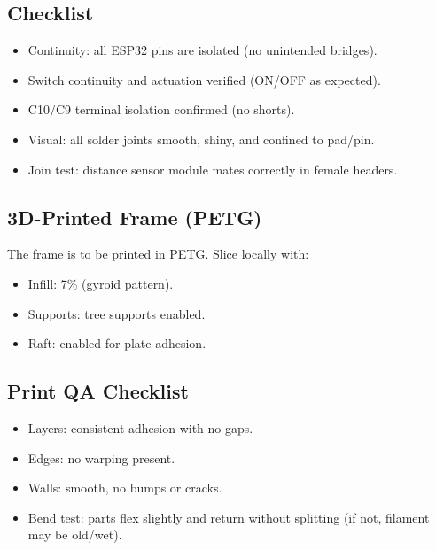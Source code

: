 \subsection*{Checklist}
\begin{itemize}
  \item[] \checkbox{} Continuity: all ESP32 pins are isolated (no unintended bridges).
  \item[] \checkbox{} Switch continuity and actuation verified (ON/OFF as expected).
  \item[] \checkbox{} C10/C9 terminal isolation confirmed (no shorts).
  \item[] \checkbox{} Visual: all solder joints smooth, shiny, and confined to pad/pin.
  \item[] \checkbox{} Join test: distance sensor module mates correctly in female headers.
\end{itemize}

\subsection*{3D-Printed Frame (PETG)}
The frame is to be printed in PETG. Slice locally with:
\begin{itemize}
  \item Infill: 7\% (gyroid pattern).
  \item Supports: tree supports enabled.
  \item Raft: enabled for plate adhesion.
\end{itemize}

\subsection*{Print QA Checklist}
\begin{itemize}
  \item[] \checkbox{} Layers: consistent adhesion with no gaps.
  \item[] \checkbox{} Edges: no warping present.
  \item[] \checkbox{} Walls: smooth, no bumps or cracks.
  \item[] \checkbox{} Bend test: parts flex slightly and return without splitting (if not, filament may be old/wet).
\end{itemize}

